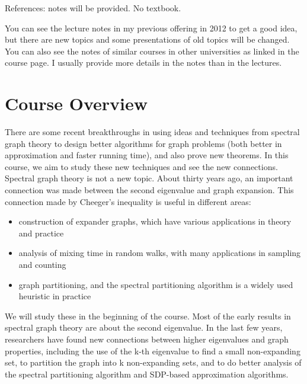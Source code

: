 \documentclass[11pt,a4paper]{report}
\def\labelitemi{--}
\begin{document}
\newline
\newline
References: notes will be provided. No textbook.
\begin{addmargin}[1em]{0em}
	 You can see the lecture notes in my previous offering in 2012 to get a good idea, but there are new topics and some presentations of old topics will be changed.
	 \newline
	 You can also see the notes of similar courses in other universities as linked in the course page. I usually provide more details in the notes than in the lectures.
\end{addmargin}

\section{Course Overview}
There are some recent breakthroughs in using ideas and techniques from spectral graph theory to design better algorithms for graph problems (both better in approximation and faster running time), and also prove new theorems. In this course, we aim to study these new techniques and see the new connections.
\newline
Spectral graph theory is not a new topic.
\newline
About thirty years ago, an important connection was made between the second eigenvalue and graph expansion. This connection made by Cheeger's inequality is useful in different areas:
\begin{itemize}
	\renewcommand\labelitemi{--}
	\item construction of expander graphs, which have various applications in theory and practice
	\item analysis of mixing time in random walks, with many applications in sampling and counting
	\item graph partitioning, and the spectral partitioning algorithm is a widely used heuristic in practice
\end{itemize}
\noindent We will study these in the beginning of the course.
\newline\newline Most of the early results in spectral graph theory are about the second eigenvalue.
\newline In the last few years, researchers have found new connections between higher eigenvalues and graph properties, including the use of the k-th eigenvalue to find a small non-expanding set, to partition the graph into k non-expanding sets, and to do better analysis of the spectral partitioning algorithm and SDP-based approximation algorithms.
\end{document}
